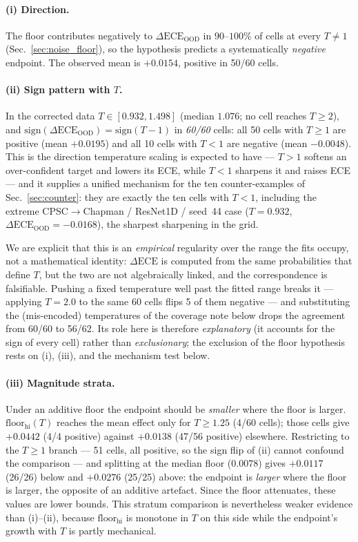 \documentclass[review,12pt,nonatbib]{elsarticle}
\begin{document}
\paragraph{(i) Direction.} The floor contributes negatively to
$\Delta\text{ECE}_{\text{OOD}}$ in $90$--$100\%$ of cells at every
$T \neq 1$ (Sec.~\ref{sec:noise_floor}), so the hypothesis predicts a
systematically \emph{negative} endpoint. The observed mean is
$+0.0154$, positive in 50/60 cells.

\paragraph{(ii) Sign pattern with $T$.} In the corrected data
$T \in [0.932, 1.498]$ (median $1.076$; no cell reaches $T \geq 2$), and
$\mathrm{sign}(\Delta\text{ECE}_{\text{OOD}}) = \mathrm{sign}(T - 1)$ in
\emph{60/60} cells: all 50 cells with $T \geq 1$ are positive (mean
$+0.0195$) and all 10 cells with $T < 1$ are negative (mean $-0.0048$).
This is the direction temperature scaling is expected to have --- $T>1$
softens an over-confident target and lowers its ECE, while $T<1$ sharpens
it and raises ECE --- and it supplies a unified mechanism for the ten
counter-examples of Sec.~\ref{sec:counter}: they are exactly the ten
cells with $T<1$, including the extreme CPSC$\rightarrow$Chapman /
ResNet1D / seed~44 case ($T = 0.932$,
$\Delta\text{ECE}_{\text{OOD}} = -0.0168$), the sharpest sharpening in
the grid.

We are explicit that this is an \emph{empirical} regularity over the
range the fits occupy, not a mathematical identity: $\Delta\text{ECE}$
is computed from the same probabilities that define $T$, but the two are
not algebraically linked, and the correspondence is falsifiable. Pushing
a fixed temperature well past the fitted range breaks it --- applying
$T = 2.0$ to the same 60 cells flips 5 of them negative --- and
substituting the (mis-encoded) temperatures of the coverage note below
drops the agreement from 60/60 to 56/62. Its role
here is therefore \emph{explanatory} (it accounts for the sign of every
cell) rather than \emph{exclusionary}; the exclusion of the floor
hypothesis rests on (i), (iii), and the mechanism test below.

\paragraph{(iii) Magnitude strata.} Under an additive floor the endpoint
should be \emph{smaller} where the floor is larger.
$\text{floor}_{\text{hi}}(T)$ reaches the mean effect only for
$T \geq 1.25$ (4/60 cells); those cells give $+0.0442$ (4/4 positive)
against $+0.0138$ (47/56 positive) elsewhere. Restricting to the
$T \geq 1$ branch --- 51 cells, all positive, so the sign flip of (ii)
cannot confound the comparison --- and splitting at the median floor
($0.0078$) gives $+0.0117$ (26/26) below and $+0.0276$ (25/25) above:
the endpoint is \emph{larger} where the floor is larger, the opposite of
an additive artefact. Since the floor attenuates, these values are lower
bounds. This stratum comparison is nevertheless weaker evidence than
(i)--(ii), because $\text{floor}_{\text{hi}}$ is monotone in $T$ on this
side while the endpoint's growth with $T$ is partly mechanical.
\end{document}
